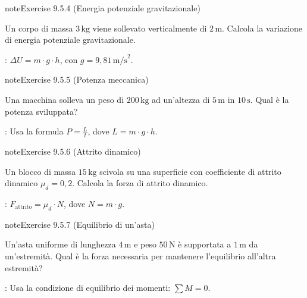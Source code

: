 \documentclass[letterpaper,10pt,italian]{jupyterBook}
\begin{document}
\begin{sphinxadmonition}{note}{Exercise 9.5.4 (Energia potenziale gravitazionale)}



\sphinxAtStartPar
Un corpo di massa \(3 \, \text{kg}\) viene sollevato verticalmente di \(2 \, \text{m}\). Calcola la variazione di energia potenziale gravitazionale.

\sphinxAtStartPar
{}: \( \Delta U = m \cdot g \cdot h \), con \(g = 9,81 \, \text{m/s}^2\).
\end{sphinxadmonition}
 \label{exercise:ch/mechanics/actions-problems-exercise-4}

\begin{sphinxadmonition}{note}{Exercise 9.5.5 (Potenza meccanica)}



\sphinxAtStartPar
Una macchina solleva un peso di \(200 \, \text{kg}\) ad un’altezza di \(5 \, \text{m}\) in \(10 \, \text{s}\). Qual è la potenza sviluppata?

\sphinxAtStartPar
{}: Usa la formula \( P = \frac{L}{t} \), dove \( L = m \cdot g \cdot h \).
\end{sphinxadmonition}
 \label{exercise:ch/mechanics/actions-problems-exercise-5}

\begin{sphinxadmonition}{note}{Exercise 9.5.6 (Attrito dinamico)}



\sphinxAtStartPar
Un blocco di massa \(15 \, \text{kg}\) scivola su una superficie con coefficiente di attrito dinamico \(\mu_d = 0,2\). Calcola la forza di attrito dinamico.

\sphinxAtStartPar
{}: \( F_{\text{attrito}} = \mu_d \cdot N \), dove \(N = m \cdot g\).
\end{sphinxadmonition}
 \label{exercise:ch/mechanics/actions-problems-exercise-6}

\begin{sphinxadmonition}{note}{Exercise 9.5.7 (Equilibrio di un’asta)}



\sphinxAtStartPar
Un’asta uniforme di lunghezza \(4 \, \text{m}\) e peso \(50 \, \text{N}\) è supportata a \(1 \, \text{m}\) da un’estremità. Qual è la forza necessaria per mantenere l’equilibrio all’altra estremità?

\sphinxAtStartPar
{}: Usa la condizione di equilibrio dei momenti: \( \sum M = 0 \).
\end{sphinxadmonition}
 \label{exercise:ch/mechanics/actions-problems-exercise-7}
\end{document}
